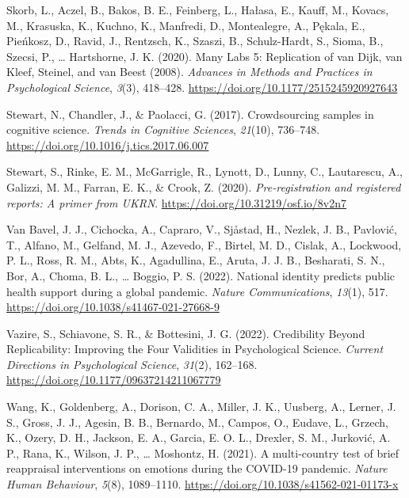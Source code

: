 \documentclass[
  man,mask,floatsintext]{apa7}
\newlength{\cslhangindent}
\newlength{\cslentryspacingunit} %
\newenvironment{CSLReferences}[2] %
 {%
  \setlength{\parindent}{0pt}
  \ifodd #1
  \let\oldpar\par
  \def\par{\hangindent=\cslhangindent\oldpar}
  \fi
  \setlength{\parskip}{#2\cslentryspacingunit}
 }%
 {}
\begin{document}
\begin{CSLReferences}{1}{0}
\leavevmode{}%
Skorb, L., Aczel, B., Bakos, B. E., Feinberg, L., Hałasa, E., Kauff, M., Kovacs, M., Krasuska, K., Kuchno, K., Manfredi, D., Montealegre, A., Pękala, E., Pieńkosz, D., Ravid, J., Rentzsch, K., Szaszi, B., Schulz-Hardt, S., Sioma, B., Szecsi, P., \ldots{} Hartshorne, J. K. (2020). Many Labs 5: Replication of van Dijk, van Kleef, Steinel, and van Beest (2008). \emph{Advances in Methods and Practices in Psychological Science}, \emph{3}(3), 418--428. \url{https://doi.org/10.1177/2515245920927643}

\leavevmode{}%
Stewart, N., Chandler, J., \& Paolacci, G. (2017). Crowdsourcing samples in cognitive science. \emph{Trends in Cognitive Sciences}, \emph{21}(10), 736--748. \url{https://doi.org/10.1016/j.tics.2017.06.007}

\leavevmode{}%
Stewart, S., Rinke, E. M., McGarrigle, R., Lynott, D., Lunny, C., Lautarescu, A., Galizzi, M. M., Farran, E. K., \& Crook, Z. (2020). \emph{Pre-registration and registered reports: A primer from UKRN}. \url{https://doi.org/10.31219/osf.io/8v2n7}

\leavevmode{}%
Van Bavel, J. J., Cichocka, A., Capraro, V., Sjåstad, H., Nezlek, J. B., Pavlović, T., Alfano, M., Gelfand, M. J., Azevedo, F., Birtel, M. D., Cislak, A., Lockwood, P. L., Ross, R. M., Abts, K., Agadullina, E., Aruta, J. J. B., Besharati, S. N., Bor, A., Choma, B. L., \ldots{} Boggio, P. S. (2022). National identity predicts public health support during a global pandemic. \emph{Nature Communications}, \emph{13}(1), 517. \url{https://doi.org/10.1038/s41467-021-27668-9}

\leavevmode{}%
Vazire, S., Schiavone, S. R., \& Bottesini, J. G. (2022). Credibility Beyond Replicability: Improving the Four Validities in Psychological Science. \emph{Current Directions in Psychological Science}, \emph{31}(2), 162--168. \url{https://doi.org/10.1177/09637214211067779}

\leavevmode{}%
Wang, K., Goldenberg, A., Dorison, C. A., Miller, J. K., Uusberg, A., Lerner, J. S., Gross, J. J., Agesin, B. B., Bernardo, M., Campos, O., Eudave, L., Grzech, K., Ozery, D. H., Jackson, E. A., Garcia, E. O. L., Drexler, S. M., Jurković, A. P., Rana, K., Wilson, J. P., \ldots{} Moshontz, H. (2021). A multi-country test of brief reappraisal interventions on emotions during the COVID-19 pandemic. \emph{Nature Human Behaviour}, \emph{5}(8), 1089--1110. \url{https://doi.org/10.1038/s41562-021-01173-x}


\end{CSLReferences}
\end{document}
